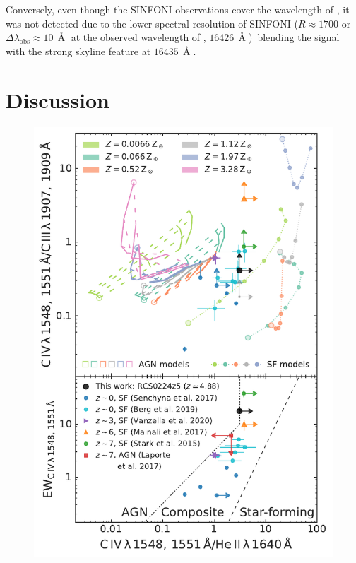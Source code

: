Conversely, even though the SINFONI observations cover the wavelength of \MgII, it was not detected due to the lower spectral resolution of SINFONI ($R \approx 1700$ or $\Delta \lambda_\text{obs} \approx 10 \, \Angstrom$ at the observed wavelength of \MgII, $16426 \, \Angstrom$)\ blending the signal with the strong skyline feature at $16435 \, \Angstrom$.

\section{Discussion}
\label{sec:Discussion}

\begin{figure}
    \centering
    \includegraphics[width=\linewidth]{"Plots/Chapter2/Line_ratios_CIV-HeII"}

\end{figure}
